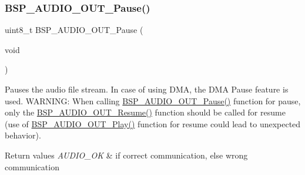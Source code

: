 \subsubsection{\texorpdfstring{B\+S\+P\+\_\+\+A\+U\+D\+I\+O\+\_\+\+O\+U\+T\+\_\+\+Pause()}{BSP\_AUDIO\_OUT\_Pause()}}
{\footnotesize\ttfamily uint8\+\_\+t B\+S\+P\+\_\+\+A\+U\+D\+I\+O\+\_\+\+O\+U\+T\+\_\+\+Pause (\begin{DoxyParamCaption}\item[{void}]{ }\end{DoxyParamCaption})}



Pauses the audio file stream. In case of using D\+MA, the D\+MA Pause feature is used. W\+A\+R\+N\+I\+NG\+: When calling \mbox{\hyperlink{group___s_t_m32_f4___d_i_s_c_o_v_e_r_y___a_u_d_i_o___o_u_t___private___functions_ga73a0f92b8adbfb2e8207067434c2bfef}{B\+S\+P\+\_\+\+A\+U\+D\+I\+O\+\_\+\+O\+U\+T\+\_\+\+Pause()}} function for pause, only the \mbox{\hyperlink{group___s_t_m32_f4___d_i_s_c_o_v_e_r_y___a_u_d_i_o___o_u_t___private___functions_ga064f0eddd4ab25a33fd1fe83af429c9f}{B\+S\+P\+\_\+\+A\+U\+D\+I\+O\+\_\+\+O\+U\+T\+\_\+\+Resume()}} function should be called for resume (use of \mbox{\hyperlink{group___s_t_m32_f4___d_i_s_c_o_v_e_r_y___a_u_d_i_o___o_u_t___private___functions_gaa415fdd481a01468fdfcd9d91f0f6711}{B\+S\+P\+\_\+\+A\+U\+D\+I\+O\+\_\+\+O\+U\+T\+\_\+\+Play()}} function for resume could lead to unexpected behavior). 


\begin{DoxyRetVals}{Return values}
{\em A\+U\+D\+I\+O\+\_\+\+OK} & if correct communication, else wrong communication \\
\hline
\end{DoxyRetVals}
\mbox{\label{group___s_t_m32_f4___d_i_s_c_o_v_e_r_y___a_u_d_i_o___o_u_t___private___functions_gaa415fdd481a01468fdfcd9d91f0f6711}} 
